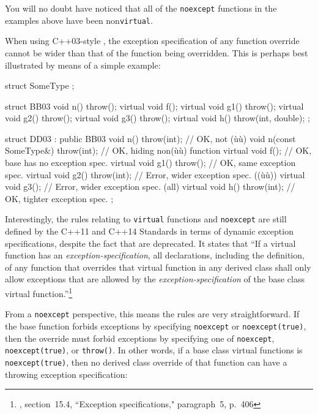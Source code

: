 You will no doubt have noticed that all of the \lstinline!noexcept!
functions in the examples above have been non\lstinline!virtual!.

When using C++03-style , the
exception specification of any function override cannot be wider than
that of the function being overridden. This is perhaps best illustrated
by means of a simple example:

\begin{emcppshiddenlisting}[emcppsbatch=e14]
struct SomeType {};
\end{emcppshiddenlisting}
\begin{emcppslisting}[emcppsbatch=e14]
struct BB03
{
    void n() throw();
    virtual void f();
    virtual void g1() throw();
    virtual void g2() throw();
    virtual void g3() throw();
    virtual void h() throw(int, double);
};

struct DD03 : public BB03
{
    void n() throw(int);                // OK, not (ù{}ù)
    void n(const SomeType&) throw(int); // OK, hiding non(ù{}ù) function
    virtual void f();                   // OK, base has no exception spec.
    virtual void g1() throw();          // OK, same exception spec.
    virtual void g2() throw(int);       // Error, wider exception spec. ((ù{}ù))
    virtual void g3();                  // Error, wider exception spec. (all)
    virtual void h() throw(int);        // OK, tighter exception spec.
};
\end{emcppslisting}
    

\noindent Interestingly, the rules relating to \lstinline!virtual! functions and
\lstinline!noexcept! are still defined by the C++11 and C++14 Standards in
terms of dynamic exception specifications, despite the fact that
 are deprecated. It states that
``If a virtual function has an \emph{exception-specification}, all
declarations, including the definition, of any function that overrides
that virtual function in any derived class shall only allow exceptions
that are allowed by the \emph{exception-specification} of the base class
virtual function.''{\cprotect\footnote{\cite{iso11}, section~15.4, ``Exception specifications," paragraph~5, p.~406}}

From a \lstinline!noexcept! perspective, this means the rules are very
straightforward. If the base function forbids exceptions by specifying
\lstinline!noexcept! or \lstinline!noexcept(true)!, then the override must
forbid exceptions by specifying one of \lstinline!noexcept!,
\lstinline!noexcept(true)!, or \lstinline!throw()!. In other words, if a base
class virtual functions is \lstinline!noexcept(true)!, then no derived
class override of that function can have a throwing exception
specification:

